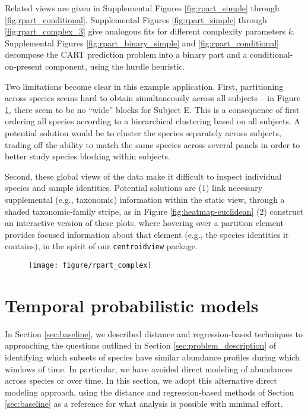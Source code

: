 \documentclass[14pt]{extreport}
\begin{document}
Related views are given in Supplemental Figures \ref{fig:rpart_simple} through
\ref{fig:rpart_conditional}. Supplemental Figures \ref {fig:rpart_simple}
through \ref{fig:rpart_complex_3} give analogous fits for different complexity
parameters $k$. Supplemental Figures \ref{fig:rpart_binary_simple} and
\ref{fig:rpart_conditional} decompose the CART prediction problem into a binary
part and a conditional-on-present component, using the hurdle heuristic.

Two limitations become clear in this example application. First, partitioning
across species seems hard to obtain simultaneously across all subjects -- in
Figure \ref{fig:rpart_complex}, there seem to be no ``wide'' blocks for Subject
E. This is a consequence of first ordering all species according to a
hierarchical clustering based on all subjects. A potential solution would be to
cluster the species separately across subjects, trading off the ability to match
the same species across several panels in order to better study species blocking
within subjects.

Second, these global views of the data make it difficult to inspect individual
species and sample identities. Potential solutions are (1) link necessary
supplemental (e.g., taxonomic) information within the static view, through a
shaded taxonomic-family stripe, as in Figure \ref{fig:heatmap-euclidean} (2)
construct an interactive version of these plots, where hovering over a partition
element provides focused information about that element (e.g., the species
identities it contains), in the spirit of our \texttt{centroidview} package.

\begin{figure}
  \centering
  \texttt{[image: figure/rpart\_complex]}
  \caption{\label{fig:rpart_complex} }
\end{figure}

\section{Temporal probabilistic models}
\label{sec:temporal_probabilistic_models}

In Section \ref{sec:baseline}, we described distance and regression-based
techniques to approaching the questions outlined in Section
\ref{sec:problem_description} of identifying which subsets of species have
similar abundance profiles during which windows of time. In particular, we have
avoided direct modeling of abundances across species or over time. In this
section, we adopt this alternative direct modeling approach, using the distance
and regression-based methods of Section \ref{sec:baseline} as a reference for
what analysis is possible with minimal effort.
\end{document}
